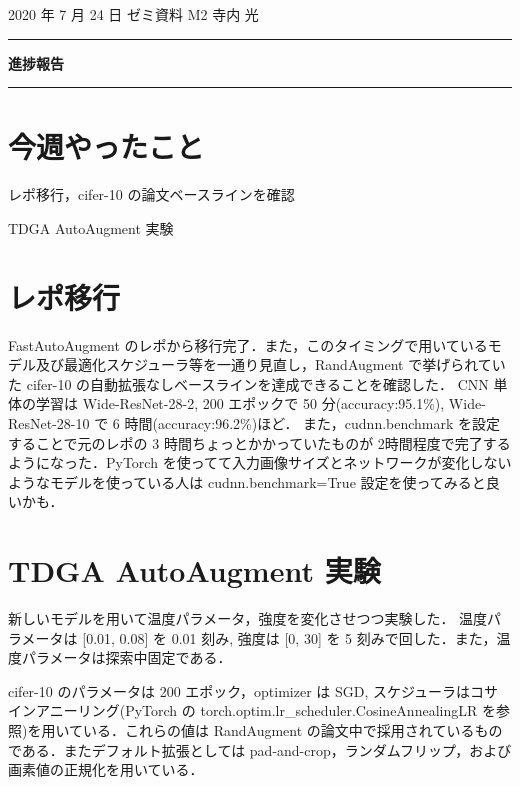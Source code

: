 \documentclass[onecolumn]{ujarticle}   %
\begin{document}
	\noindent

	\hspace{1em}
	2020 年 7 月 24 日
	ゼミ資料
	\hfill
	M2 寺内 光

	\vspace{2mm}

	\hrule

	\begin{center}
		{\Large \bf 進捗報告}
	\end{center}

	\hrule
	\vspace{3mm}

	\section{今週やったこと}
	\begin{itemize}{
    \item{レポ移行，cifer-10 の論文ベースラインを確認}
    \item{TDGA AutoAugment 実験}
	}\end{itemize}

  \section{レポ移行}
  FastAutoAugment のレポから移行完了．また，このタイミングで用いているモデル及び最適化スケジューラ等を一通り見直し，RandAugment で挙げられていた cifer-10 の自動拡張なしベースラインを達成できることを確認した．
  CNN 単体の学習は Wide-ResNet-28-2, 200 エポックで 50 分(accuracy:95.1\%), Wide-ResNet-28-10 で 6 時間(accuracy:96.2\%)ほど．
  また，cudnn.benchmark を設定することで元のレポの 3 時間ちょっとかかっていたものが 2時間程度で完了するようになった．PyTorch を使ってて入力画像サイズとネットワークが変化しないようなモデルを使っている人は cudnn.benchmark=True 設定を使ってみると良いかも．

  \section{TDGA AutoAugment 実験}
  新しいモデルを用いて温度パラメータ，強度を変化させつつ実験した．
  温度パラメータは [0.01, 0.08] を 0.01 刻み, 強度は [0, 30] を 5 刻みで回した．また，温度パラメータは探索中固定である．

  cifer-10 のパラメータは 200 エポック，optimizer は SGD, スケジューラはコサインアニーリング(PyTorch の torch.optim.lr\_scheduler.CosineAnnealingLR を参照)を用いている．これらの値は RandAugment の論文中で採用されているものである．またデフォルト拡張としては pad-and-crop，ランダムフリップ，および画素値の正規化を用いている．
\end{document}
